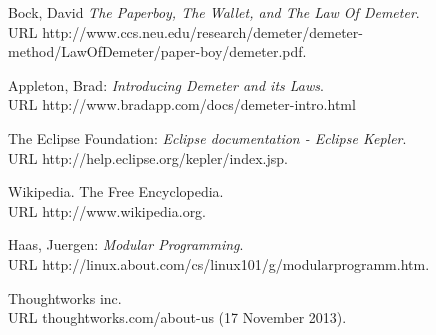 \documentclass[12pt,a4paper,oneside, 
liststotoc, 					%
bibtotoc,						%
titlepage, 						%
headsepline, 					%
BCOR6mm,						%
english
]{scrreprt}
\begin{document}
\begin{thebibliography}{999999}
 Bock, David
\emph{The Paperboy, The Wallet, and The Law Of Demeter}. \\ URL http://www.ccs.neu.edu/research/demeter/demeter-method/LawOfDemeter/paper-boy/demeter.pdf.

 Appleton, Brad:
\emph{Introducing Demeter and its Laws}. \\ URL http://www.bradapp.com/docs/demeter-intro.html

 The Eclipse Foundation: 
\emph{Eclipse documentation - Eclipse Kepler}. \\ URL http://help.eclipse.org/kepler/index.jsp.

 Wikipedia. The Free Encyclopedia. \\ URL http://www.wikipedia.org. 

 Haas, Juergen: \emph{Modular Programming}.\\ URL http://linux.about.com/cs/linux101/g/modularprogramm.htm.

 Thoughtworks inc. \\ URL thoughtworks.com/about-us  (17 November 2013).

\end{thebibliography}


\begin{appendix}
\clearpage
{}						%
\end{appendix}
\end{document}
